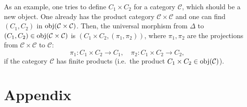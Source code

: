 \documentclass[openany, a5paper]{book}
\begin{document}
As an example, one tries to define $C_1 \times C_2$ for a category $\mathcal C$, which should be a new object.
One already has the product category $\mathcal C \times \mathcal C$ and one can find $(C_1, C_2)$ in $\operatorname{obj}(\mathcal C \times \mathcal C)$.
Then, the universal morphism from $\Delta$ to $(C_1, C_2) \in \operatorname{obj}(\mathcal C \times \mathcal C)$ is $(C_1 \times C_2, (\pi_1, \pi_2))$, where $\pi_1, \pi_2$ are the projections from $\mathcal C \times \mathcal C$ to $\mathcal C$:
\begin{equation}
	\pi_1 \colon C_1 \times C_2 \to C_1,
	\quad
	\pi_2 \colon C_1 \times C_2 \to C_2,
\end{equation}
if the category $\mathcal C$ has finite products (i.e.\ the product $C_1 \times C_2 \in \operatorname{obj}(\mathcal C)$). 

\appendix
\chapter{Appendix}

\backmatter
\nocite{*} %
\printbibliography[heading=bibliography, title={Bibliography}]


\printindex
\end{document}
